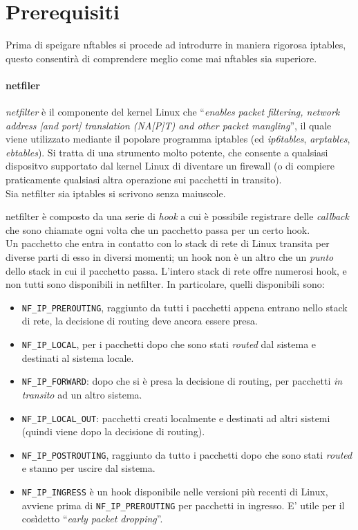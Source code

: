 \section{Prerequisiti}
Prima di speigare nftables si procede ad introdurre in maniera rigorosa iptables,
questo consentirà di comprendere meglio come mai nftables sia superiore.

\paragraph{netfiler}
\textit{netfilter} è il componente del kernel Linux che
``\textit{enables packet filtering, network address [and port] translation
(NA[P]T) and other packet mangling}'', il quale viene utilizzato mediante il
popolare programma iptables (ed \textit{ip6tables}, \textit{arptables},
\textit{ebtables}). Si tratta di una strumento molto
potente, che consente a qualsiasi dispositvo supportato dal kernel Linux
di diventare un firewall (o di compiere praticamente qualsiasi altra operazione
sui pacchetti in transito).\\
Sia netfilter sia iptables si scrivono senza maiuscole.


netfilter è composto da una serie di \textit{hook} a cui è possibile registrare
delle \textit{callback} che sono chiamate ogni volta che un pacchetto passa per
un certo hook.\\
Un pacchetto che entra in contatto con lo stack di rete di Linux transita per
diverse parti di esso in diversi momenti; un hook non è un altro che un \textit{punto} dello stack
in cui il pacchetto passa.
L'intero stack di rete offre numerosi hook, e non tutti sono disponibili in netfilter.
In particolare, quelli disponibili sono:
\begin{itemize}
  \item \texttt{NF\_IP\_PREROUTING}, raggiunto da tutti i pacchetti appena entrano nello
  stack di rete, la decisione di routing deve ancora essere presa.
  \item \texttt{NF\_IP\_LOCAL}, per i pacchetti dopo che sono stati \textit{routed}
  dal sistema e destinati al sistema locale.
  \item \texttt{NF\_IP\_FORWARD}: dopo che si è presa la decisione di routing,
  per pacchetti \textit{in transito} ad un altro sistema.
  \item \texttt{NF\_IP\_LOCAL\_OUT}: pacchetti creati localmente e destinati ad
  altri sistemi (quindi viene dopo la decisione di routing).
  \item \texttt{NF\_IP\_POSTROUTING}, raggiunto da tutto i pacchetti dopo che
  sono stati \textit{routed} e stanno per uscire dal sistema.
  \item \texttt{NF\_IP\_INGRESS} è un hook disponibile nelle versioni più recenti di
  Linux, avviene prima di \texttt{NF\_IP\_PREROUTING} per pacchetti in ingresso.
  E' utile per il cosìdetto ``\textit{early packet dropping}''.
\end{itemize}

